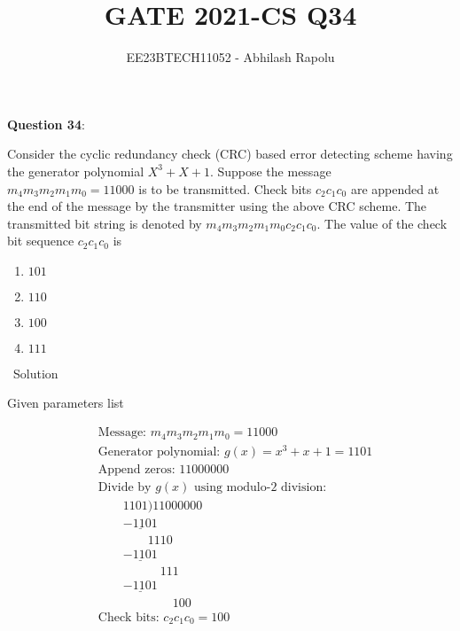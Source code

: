\documentclass[journal,12pt,twocolumn]{IEEEtran}
\title{GATE 2021-CS Q34}
\author{EE23BTECH11052 - Abhilash Rapolu}
\begin{document}
\maketitle

\textbf {Question 34}:

Consider the cyclic redundancy check (CRC) based error detecting scheme having the generator polynomial $X^3 + X + 1$. Suppose the message $m_4m_3m_2m_1m_0 = 11000$ is to be transmitted. Check bits $c_2c_1c_0$ are appended at the end of the message by the transmitter using the above CRC scheme. The transmitted bit string is denoted by $m_4m_3m_2m_1m_0c_2c_1c_0$. The value of the check bit sequence $c_2c_1c_0$ is

\begin{enumerate}
\item $101$
\item $110$
\item $100$  
\item $111$
\end{enumerate}

\ Solution\\

\begin{table}[htbp]
\centering

\caption{Given parameters list}
\end{table}
\begin{align}
&\text{Message: } m_4m_3m_2m_1m_0 = 11000 \\
&\text{Generator polynomial: } g(x) = x^3 + x + 1 = 1101 \\
&\text{Append zeros: } 11000000 \\
&\text{Divide by } g(x)\text{ using modulo-2 division:} \\
&\qquad 1101)11000000 \\
&\qquad \underline{-1101} \\
&\qquad \qquad 1110 \\
&\qquad \underline{-1101} \\
&\qquad \qquad \quad 111 \\
&\qquad \underline{-1101} \\
&\qquad \qquad \quad \quad 100 \\
&\text{Check bits: } c_2c_1c_0 = 100
\end{align}
\end{document}
